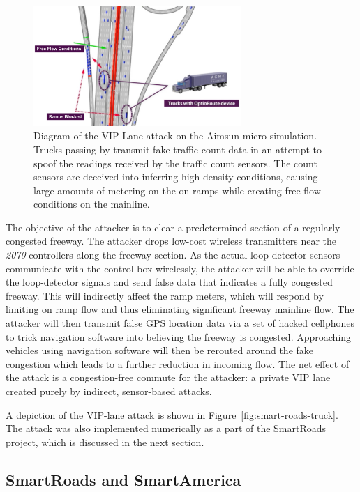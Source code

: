 \begin{figure}[t]
    \centering
    \includegraphics[width=0.7\textwidth]{diagrams/trucks}
    \caption{Diagram of the VIP-Lane attack on the Aimsun micro-simulation. Trucks passing by transmit fake traffic count data in an attempt to spoof the readings received by the traffic count sensors. The count sensors are deceived into inferring high-density conditions, causing large amounts of metering on the on ramps while creating free-flow conditions on the mainline.}
    \label{fig:smart-roads-diagram}
\end{figure}


            The objective of the attacker is to clear a predetermined section of a regularly congested freeway. The attacker drops low-cost wireless transmitters near the \emph{2070} controllers along the freeway section. As the actual loop-detector sensors communicate with the control box wirelessly, the attacker will be able to override the loop-detector signals and send false data that indicates a fully congested freeway. This will indirectly affect the ramp meters, which will respond by limiting on ramp flow and thus eliminating significant freeway mainline flow. The attacker will then transmit false GPS location data via a set of hacked cellphones to trick navigation software into believing the freeway is congested. Approaching vehicles using navigation software will then be rerouted around the fake congestion which leads to a further reduction in incoming flow. The net effect of the attack is a congestion-free commute for the attacker: a private VIP lane created purely by indirect, sensor-based attacks.

A depiction of the VIP-lane attack is shown in Figure~\ref{fig:smart-roads-truck}. The attack was also implemented numerically as a part of the SmartRoads project, which is discussed in the next section.

\subsection{SmartRoads and SmartAmerica}

